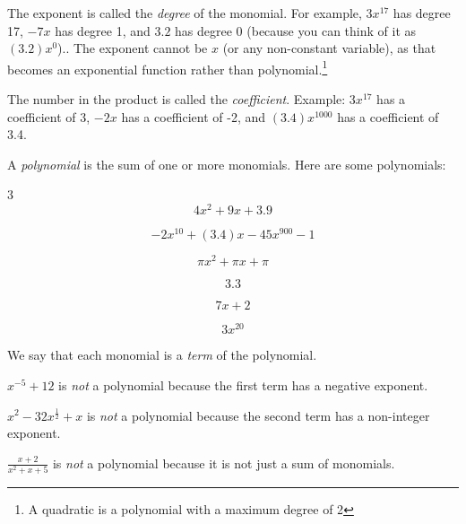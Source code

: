 The exponent is called the \emph{degree} of the monomial. For example, $3x^{17}$
has degree 17, $-7x$ has degree 1, and $3.2$ has degree 0 (because you can think of it as $(3.2)x^0$).. The exponent cannot be $x$ (or any non-constant variable), as that becomes an exponential function rather than polynomial.\footnote{A quadratic is a polynomial with a maximum degree of 2}

The number in the product is called the \emph{coefficient}.  Example: $3x^{17}$ has a coefficient of 3, $-2x$ has a coefficient of -2, and $(3.4)x^{1000}$ has a coefficient of 3.4.

A \emph{polynomial}  is the sum of one or more monomials.  Here are some polynomials:
\begin{multicols}{3}
  \begin{equation*}
    4 x^2 + 9x + 3.9
  \end{equation*}

  \begin{equation*}
    -2 x^{10} + (3.4)x - 45x^{900} - 1
  \end{equation*}

  \begin{equation*}
    \pi x^2 + \pi x + \pi
  \end{equation*}

  \begin{equation*}
    3.3
  \end{equation*}

  \begin{equation*}
   7x + 2
  \end{equation*}

  \begin{equation*}
    3x^{20}
  \end{equation*}
\end{multicols}
We say that each monomial is a \emph{term} of the polynomial.

$x^{-5} + 12$ is \emph{not} a polynomial because the first term has a negative exponent.

$x^{2} - 32x^{\frac{1}{2}} + x$ is \emph{not} a polynomial because the second term has a non-integer exponent.

$\frac{x + 2}{x^2 + x + 5}$ is \emph{not} a polynomial because it is not just a sum of monomials.

